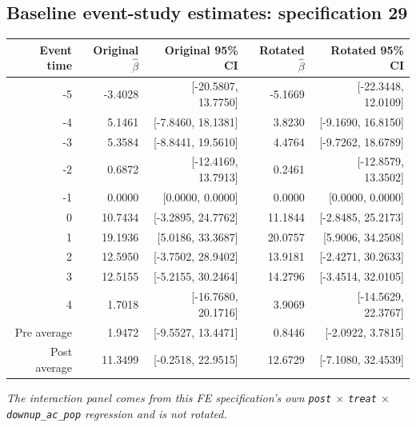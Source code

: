 \documentclass[10pt]{article}
\begin{document}
\subsection*{Baseline event-study estimates: specification 29}
\begin{center}
\scriptsize
\begin{tabular}{r rr rr}
\toprule
Event time & Original $\hat\beta$ & Original 95\% CI & Rotated $\hat\beta$ & Rotated 95\% CI \\
\midrule
-5 & -3.4028 & [-20.5807, 13.7750] & -5.1669 & [-22.3448, 12.0109] \\
-4 & 5.1461 & [-7.8460, 18.1381] & 3.8230 & [-9.1690, 16.8150] \\
-3 & 5.3584 & [-8.8441, 19.5610] & 4.4764 & [-9.7262, 18.6789] \\
-2 & 0.6872 & [-12.4169, 13.7913] & 0.2461 & [-12.8579, 13.3502] \\
-1 & 0.0000 & [0.0000, 0.0000] & 0.0000 & [0.0000, 0.0000] \\
0 & 10.7434 & [-3.2895, 24.7762] & 11.1844 & [-2.8485, 25.2173] \\
1 & 19.1936 & [5.0186, 33.3687] & 20.0757 & [5.9006, 34.2508] \\
2 & 12.5950 & [-3.7502, 28.9402] & 13.9181 & [-2.4271, 30.2633] \\
3 & 12.5155 & [-5.2155, 30.2464] & 14.2796 & [-3.4514, 32.0105] \\
4 & 1.7018 & [-16.7680, 20.1716] & 3.9069 & [-14.5629, 22.3767] \\
\midrule
Pre average & 1.9472 & [-9.5527, 13.4471] & 0.8446 & [-2.0922, 3.7815] \\
Post average & 11.3499 & [-0.2518, 22.9515] & 12.6729 & [-7.1080, 32.4539] \\
\bottomrule
\end{tabular}
\end{center}
\medskip
\textit{The interaction panel comes from this FE specification's own \texttt{post} $\times$ \texttt{treat} $\times$ \texttt{downup\_ac\_pop} regression and is not rotated.}
\clearpage
\end{document}
